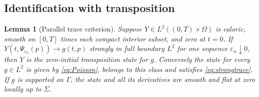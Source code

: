 \documentclass[11pt]{article}
\newtheorem{lemma}[theorem]{Lemma}
\theoremstyle{remark}
\newcommand{\Om}{\Omega}
\begin{document}
\subsection{Identification with transposition}
\begin{lemma}[Parallel trace criterion]\label{lem:trace}
Suppose $Y\in L^2((0,T)\times\Om)$ is caloric, smooth on
$[0,T]$ times each compact interior subset, and zero at $t=0$.
If $Y(t,\Psi_{\varepsilon_n}(p))\to g(t,p)$ strongly in full boundary
$L^2$ for one sequence $\varepsilon_n\downarrow0$, then $Y$ is the
zero-initial transposition state for $g$.
Conversely the state for every $g\in L^2$ is given by
\eqref{eq:Poisson}, belongs to this class and satisfies
\eqref{eq:strongtrace}.
If $g$ is supported on $\Gamma$, the state and all its derivatives are
smooth and flat at zero locally up to $\Sigma$.
\end{lemma}
\end{document}
